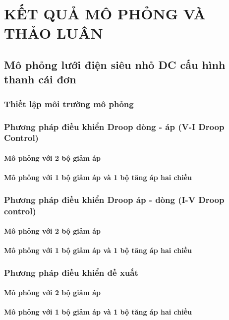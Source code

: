 \clearpage
\section{KẾT QUẢ MÔ PHỎNG VÀ THẢO LUÂN}

\subsection{Mô phỏng lưới điện siêu nhỏ DC cấu hình thanh cái đơn}
\subsubsection{Thiết lập môi trường mô phỏng}
\lipsum[1] 
\subsubsection{Phương pháp điều khiển Droop dòng - áp (V-I Droop Control)}
\paragraph{Mô phỏng với 2 bộ giảm áp}
\lipsum[2] 
\paragraph{Mô phỏng với 1 bộ giảm áp và 1 bộ tăng áp hai chiều}
\lipsum[3] 
\subsubsection{Phương pháp điều khiển Droop áp - dòng (I-V Droop control)}
\paragraph{Mô phỏng với 2 bộ giảm áp}
\lipsum[4] 
\paragraph{Mô phỏng với 1 bộ giảm áp và 1 bộ tăng áp hai chiều}
\lipsum[5]
\subsubsection{Phương pháp điều khiển đề xuất}
\paragraph{Mô phỏng với 2 bộ giảm áp}
\lipsum[6]
\paragraph{Mô phỏng với 1 bộ giảm áp và 1 bộ tăng áp hai chiều}
\lipsum[7]
